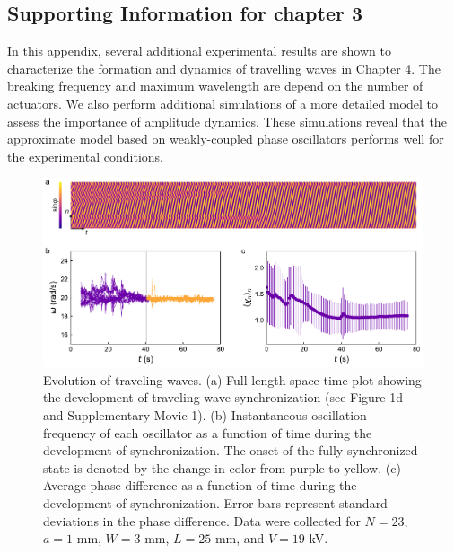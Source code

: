 \begin{appendices}



\chapter{Supporting Information for chapter 3}

In this appendix, several additional experimental results are shown to characterize the formation and dynamics of travelling waves in Chapter 4. The breaking frequency and maximum wavelength are depend on the number of actuators. We also perform additional simulations of a more detailed model to assess the importance  of  amplitude  dynamics.  These simulations  reveal  that  the  approximate  model  based  on  weakly-coupled  phase  oscillators performs well for the experimental conditions.

\begin{figure}[p]
    \centering
    \includegraphics{figures/A2_SI1-v3.pdf}
    \caption{Evolution of traveling waves. (a) Full length space-time plot showing the development of traveling wave synchronization (see Figure 1d and Supplementary Movie 1). (b) Instantaneous oscillation frequency of each oscillator as a function of time during the development of synchronization. The onset of the fully synchronized state is denoted by the change in color from purple to yellow. (c) Average phase difference as a function of time during the development of synchronization. Error bars represent standard deviations in the phase difference. Data were collected for $N=23$, $a=1$ mm, $W=3$ mm, $L=25$ mm, and $V=19$ kV.}
    \label{fig:SI1}
\end{figure}



\end{appendices}
